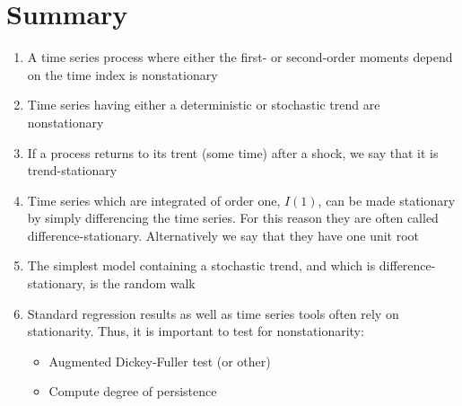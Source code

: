 \documentclass[10pt]{article}
\begin{document}
\section{Summary}
\begin{enumerate}
    \item A time series process where either the first- or second-order moments depend on the time index is nonstationary
    \item Time series having either a deterministic or stochastic trend are nonstationary
    \item If a process returns to its trent (some time) after a shock, we say that it is trend-stationary 
    \item Time series which are integrated of order one, $I(1) $, can be made stationary by simply differencing the time series. For this reason they are often called difference-stationary. Alternatively we say that they have one unit root 
    \item The simplest model containing a stochastic trend, and which is difference-stationary, is the random walk 
    \item Standard regression results as well as time series tools often rely on stationarity. Thus, it is important to test for nonstationarity: 
    \begin{itemize}
        \item Augmented Dickey-Fuller test (or other)
        \item Compute degree of persistence 
    \end{itemize}
\end{enumerate}
\end{document}
